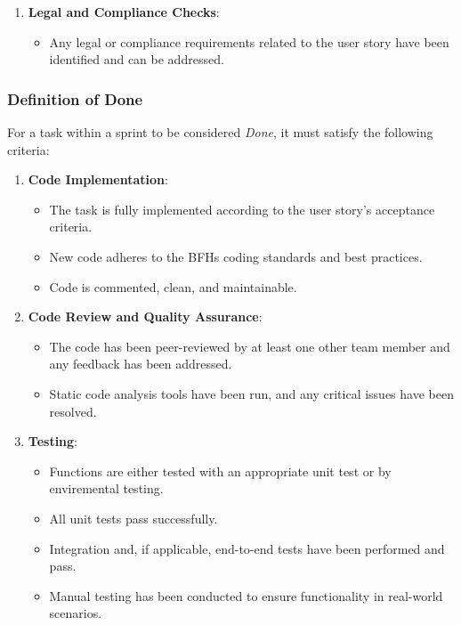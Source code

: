 \documentclass[11pt,a4paper]{article}
\begin{document}
\begin{enumerate}
        \item \textbf{Legal and Compliance Checks}:
        \begin{itemize}
            \item Any legal or compliance requirements related to the user story have been identified and can be addressed.
        \end{itemize}
    \end{enumerate}

    \subsubsection{Definition of Done}
    For a task within a sprint to be considered \textit{Done}, it must satisfy the following criteria:

    \begin{enumerate}
        \item \textbf{Code Implementation}:
        \begin{itemize}
            \item The task is fully implemented according to the user story's acceptance criteria.
            \item New code adheres to the BFHs coding standards and best practices.
            \item Code is commented, clean, and maintainable.
        \end{itemize}

        \item \textbf{Code Review and Quality Assurance}:
        \begin{itemize}
            \item The code has been peer-reviewed by at least one other team member and any feedback has been addressed.
            \item Static code analysis tools have been run, and any critical issues have been resolved.
        \end{itemize}

        \item \textbf{Testing}:
        \begin{itemize}
            \item Functions are either tested with an appropriate unit test or by enviremental testing.
            \item All unit tests pass successfully.
            \item Integration and, if applicable, end-to-end tests have been performed and pass.
            \item Manual testing has been conducted to ensure functionality in real-world scenarios.
        \end{itemize}


\end{enumerate}
\end{document}
